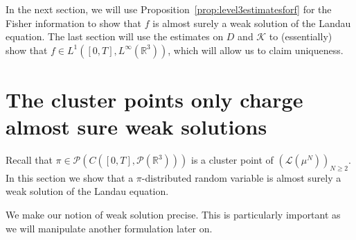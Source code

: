 \documentclass[11pt,a4paper]{article}
\theoremstyle{definition}
\theoremstyle{plain}
\begin{document}
In the next section, we will use Proposition~\ref{prop:level3estimatesforf} for the Fisher information to show that $f$ is almost surely a weak solution of the Landau equation. The last section will use the estimates on $D$ and $\mathcal{K}$ to (essentially) show that $f\in L^1([0,T],L^\infty(\mathbb{R}^3))$, which will allow us to claim uniqueness.

\section{The cluster points only charge almost sure weak solutions}
\label{sec:almostsureweaksolution}
Recall that $\pi \in \mathcal{P}\left(C([0,T],\mathcal{P}(\mathbb{R}^3)) \right)$ is a cluster point of $\left(\mathcal{L}\left( \mu^N\right) \right)_{N\geq 2 }$. In this section we show that a $\pi$-distributed random variable is almost surely a weak solution of the Landau equation.

We make our notion of weak solution precise. This is particularly important as we will manipulate another formulation later on.
\end{document}
